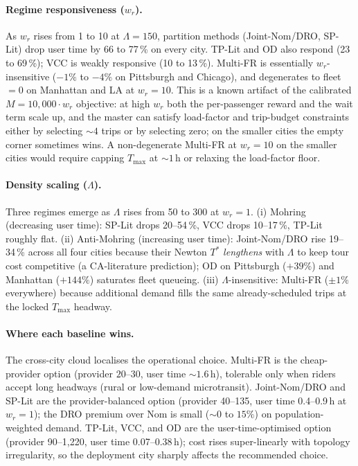 \paragraph{Regime responsiveness ($w_r$).} As $w_r$ rises from 1 to 10 at $\Lambda{=}150$, partition methods (Joint-Nom/DRO, SP-Lit) drop user time by 66 to 77\,\% on every city. TP-Lit and OD also respond (23 to 69\,\%); VCC is weakly responsive (10 to 13\,\%). Multi-FR is essentially $w_r$-insensitive ($-1\%$ to $-4\%$ on Pittsburgh and Chicago), and degenerates to fleet$=0$ on Manhattan and LA at $w_r{=}10$. This is a known artifact of the calibrated $M = 10{,}000 \cdot w_r$ objective: at high $w_r$ both the per-passenger reward and the wait term scale up, and the master can satisfy load-factor and trip-budget constraints either by selecting $\sim 4$ trips or by selecting zero; on the smaller cities the empty corner sometimes wins. A non-degenerate Multi-FR at $w_r{=}10$ on the smaller cities would require capping $T_{\max}$ at $\sim 1$\,h or relaxing the load-factor floor.

\paragraph{Density scaling ($\Lambda$).} Three regimes emerge as $\Lambda$ rises from 50 to 300 at $w_r{=}1$. (i) Mohring (decreasing user time): SP-Lit drops 20--54\,\%, VCC drops 10--17\,\%, TP-Lit roughly flat. (ii) Anti-Mohring (increasing user time): Joint-Nom/DRO rise 19--34\,\% across all four cities because their Newton $T^*$ \emph{lengthens} with $\Lambda$ to keep tour cost competitive (a CA-literature prediction); OD on Pittsburgh ($+39\%$) and Manhattan ($+144\%$) saturates fleet queueing. (iii) $\Lambda$-insensitive: Multi-FR ($\pm 1\%$ everywhere) because additional demand fills the same already-scheduled trips at the locked $T_{\max}$ headway.

\paragraph{Where each baseline wins.} The cross-city cloud localises the operational choice. Multi-FR is the cheap-provider option (provider $20$--$30$, user time $\sim 1.6$\,h), tolerable only when riders accept long headways (rural or low-demand microtransit). Joint-Nom/DRO and SP-Lit are the provider-balanced option (provider 40--135, user time 0.4--0.9\,h at $w_r{=}1$); the DRO premium over Nom is small ($\sim 0$ to $15\%$) on population-weighted demand. TP-Lit, VCC, and OD are the user-time-optimised option (provider 90--1{,}220, user time 0.07--0.38\,h); cost rises super-linearly with topology irregularity, so the deployment city sharply affects the recommended choice.

